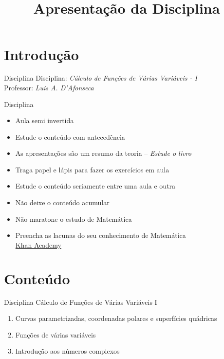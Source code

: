 \documentclass[fleqn,utf8,aspectratio=169,12pt]{beamer}
\title{Apresentação da Disciplina}
\begin{document}
\addtitle

\section{Introdução}

\begin{frame}{Disciplina}
   Disciplina: \emph{\large Cálculo de Funções de Várias Variáveis - I}\\[7mm]
   Professor: \emph{\large Luis A. D'Afonseca}
\end{frame}

\begin{frame}{Disciplina}
\begin{itemize}[<+->]
  \item Aula semi invertida
  \item Estude o conteúdo com antecedência
  \item As apresentações são um resumo da teoria -- \emph{Estude o livro}
  \item Traga papel e lápis para fazer os exercícios em aula
  \item Estude o conteúdo seriamente entre uma aula e outra
  \item Não deixe o conteúdo acumular
  \item Não maratone o estudo de Matemática
  \item Preencha as lacunas do seu conhecimento de Matemática \\
        \href{https://pt.khanacademy.org}{Khan Academy}
\end{itemize}
\end{frame}

\section{Conteúdo}


\begin{frame}{Disciplina}
  Cálculo de Funções de Várias Variáveis I
  \begin{enumerate}[<+->]
    \item Curvas parametrizadas, coordenadas polares e superfícies quádricas
    \item Funções de várias variáveis
    \item Introdução aos números complexos
  \end{enumerate}
\end{frame}
\end{document}
